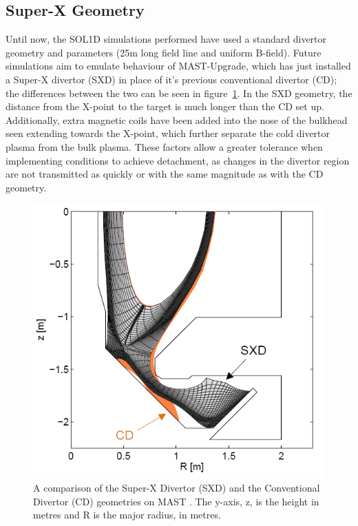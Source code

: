 \documentclass[12pt]{article}  %
\begin{document}
\subsection{Super-X Geometry}\label{ssecSXG}
Until now, the SOL1D simulations performed have used a standard divertor geometry and parameters (25m long field line and uniform B-field). Future simulations aim to emulate behaviour of MAST-Upgrade, which has just installed a Super-X divertor (SXD) in place of it's previous conventional divertor (CD); the differences between the two can be seen in figure~\ref{figCDvsSXD}. In the SXD geometry, the distance from the X-point to the target is much longer than the CD set up. Additionally, extra magnetic coils have been added into the nose of the bulkhead seen extending towards the X-point, which further separate the cold divertor plasma from the bulk plasma. These factors allow a greater tolerance when implementing conditions to achieve detachment, as changes in the divertor region are not transmitted as quickly or with the same magnitude as with the CD geometry.

\begin{figure}
\includegraphics[scale=0.5]{Figures/CDvsSXD.png}
\centering
\caption{A comparison of the Super-X Divertor (SXD) and the Conventional Divertor (CD) geometries on MAST \cite{Havlickova2014}. The y-axis, z, is the height in metres and R is the major radius, in metres.}\label{figCDvsSXD}
\end{figure}
\end{document}

